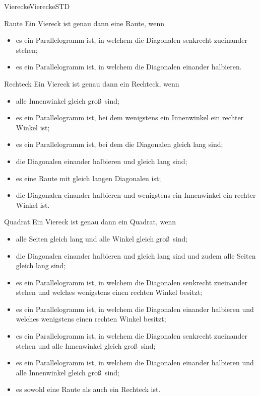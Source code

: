 \begin{MXContent}{Vierecke}{Vierecke}{STD}
\begin{MXInfo}{Raute}%
Ein Viereck ist genau dann eine Raute, wenn
\begin{itemize}
 \item es ein Parallelogramm ist, in welchem die Diagonalen senkrecht zueinander stehen;
 \item es ein Parallelogramm ist, in welchem die Diagonalen einander halbieren.
\end{itemize}
\end{MXInfo}


\begin{MXInfo}{Rechteck}%
Ein Viereck ist genau dann ein Rechteck, wenn
\begin{itemize}
 \item alle Innenwinkel gleich gro\ss\ sind;
\item es ein Parallelogramm ist, bei dem wenigstens ein Innenwinkel ein rechter Winkel ist;
\item es ein Parallelogramm ist, bei dem die Diagonalen gleich lang sind; 
\item die Diagonalen einander halbieren und gleich lang sind;
\item es eine Raute mit gleich langen Diagonalen ist;
\item die Diagonalen einander halbieren und wenigstens ein Innenwinkel ein rechter Winkel ist.
\end{itemize}
\end{MXInfo}


\begin{MXInfo}{Quadrat}%
Ein Viereck ist genau dann ein Quadrat, wenn
\begin{itemize}
\item alle Seiten gleich lang und alle Winkel gleich gro\ss\ sind;
 \item die Diagonalen einander halbieren und gleich lang sind und zudem alle Seiten gleich lang sind;
 \item es ein Parallelogramm ist, in welchem die Diagonalen senkrecht zueinander stehen und welches wenigstens einen rechten Winkel besitzt;
 \item es ein Parallelogramm ist, in welchem die Diagonalen einander halbieren und welches wenigstens einen rechten Winkel besitzt;
 \item es ein Parallelogramm ist, in welchem die Diagonalen senkrecht zueinander stehen und alle Innenwinkel gleich gro\ss\ sind;
 \item es ein Parallelogramm ist, in welchem die Diagonalen einander halbieren und alle Innenwinkel gleich gro\ss\ sind;
\item es sowohl eine Raute als auch ein Rechteck ist.
\end{itemize}
\end{MXInfo}
\end{MXContent}


